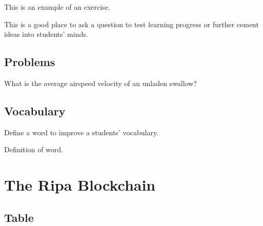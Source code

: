 \documentclass[11pt,fleqn,oneside]{book} %
\begin{document}
This is an example of an exercise.

\begin{exercise}
	This is a good place to ask a question to test learning progress or further cement ideas into students' minds.
\end{exercise}


\section{Problems}

\begin{problem}
What is the average airspeed velocity of an unladen swallow?
\end{problem}


\section{Vocabulary}

Define a word to improve a students' vocabulary.

\begin{vocabulary}[Word]
	Definition of word.
\end{vocabulary}





\chapter{The Ripa Blockchain}

\section{Table}
\end{document}
